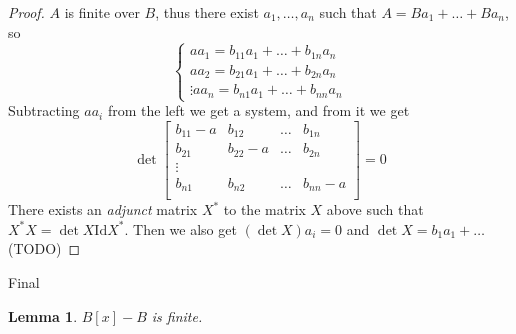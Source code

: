 \documentclass[12pt]{article}
\newcommand{\Id}{\mathrm{Id}}
\newtheorem{lemma}{Lemma}
\begin{document}
    \begin{proof}
        $A$ is finite over $B$, thus there exist $a_1, \dots, a_n$ such that $A = Ba_1 + \dots + Ba_n$, so 
        $$\begin{cases}
            aa_1 = b_{11}a_1 + \dots + b_{1n}a_n \\
            aa_2 = b_{21}a_1 + \dots + b_{2n}a_n \\
            \vdots 
            aa_n = b_{n1}a_1 + \dots + b_{nn}a_n
        \end{cases}
        $$
        Subtracting $aa_i$ from the left we get a system, and from it we get 
        $$\det \begin{bmatrix}
            b_{11}-a & b_{12} & \dots & b_{1n} \\
            b_{21} & b_{22}-a & \dots & b_{2n} \\
            \vdots \\
            b_{n1} & b_{n2} & \dots & b_{nn}-a \\
        \end{bmatrix} = 0$$
        There exists an \textit{adjunct} matrix $X^*$ to the matrix $X$ above such that $X^*X = \det X \Id X^*$. Then we also get 
        $(\det X)a_i = 0$ and $\det X = b_1a_1 + \dots $ (TODO) 
    \end{proof}
    Final 
    \begin{lemma}
         $B[x] - B$ is finite.
    \end{lemma}
\end{document}
